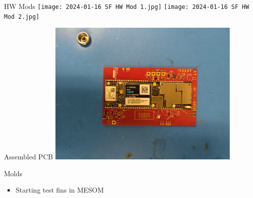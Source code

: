\begin{frame}{HW Mods}
    \centering
    \texttt{[image: 2024-01-16 SF HW Mod 1.jpg]}
    \texttt{[image: 2024-01-16 SF HW Mod 2.jpg]}
\end{frame}
\begin{frame}{Assembled PCB}
    \centering
    \includegraphics[height=0.7\textheight,width=0.7\textwidth,keepaspectratio]{2024-01-16 SF Full PCB.jpg}
\end{frame}
\begin{frame}{Molds}
    \begin{itemize}
        \item Starting test fins in MESOM
    \end{itemize}
\end{frame}